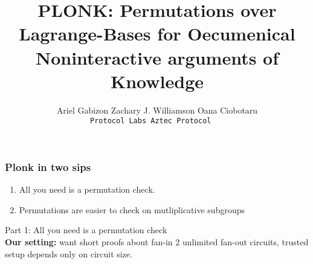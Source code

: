 \documentclass[shadesubsections,trans,14pt,mathserif]{beamer}
\title{\large{PLONK: Permutations over Lagrange-Bases for Oecumenical Noninteractive arguments of Knowledge}}    %
\author{\small{Ariel Gabizon  \; Zachary J. Williamson   \;Oana Ciobotaru}\\                 %
\tt{\footnotesize{Protocol Labs   \;\;\;\;\;\; Aztec Protocol   \;\;\;\;\;\;\;\;\;\;\;\;     \;\;\;\;\;\;\;\;\;\;\;\;\;\;\;\;\;\;\;     \;\;            \;\;\;\;\;\;\;\;\;\;\;\;          \;\;\;\;\;\;\;\;\;\;\;\;\;\;\;\;\;\;\;\;\;\;\;\;\;\;\;\;\;\;}                                       } }      %
\date{}                    %
\newcommand{\F}{\ensuremath{\mathbb F}}
\newcommand{\polysofdeg}[1]{\F_{< #1}[X]}
\begin{document}
\boldmath
\begin{frame}
  \titlepage
\end{frame}



\begin{frame}
\frametitle{Plonk in two sips}   %
 
  \begin{enumerate}

\item All you need is a permutation check.
 \item Permutations are easier to check on mutliplicative subgroups
\end{enumerate}


\end{frame}


\begin{frame}
\large{Part 1: All you need is a permutation check}\\
 \vspace{0.2in}
\normalsize{\textbf{Our setting:} want short proofs about fan-in 2 unlimited fan-out circuits, trusted setup depends only on circuit size.}
\end{frame}
\end{document}

